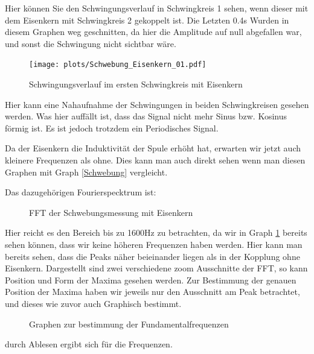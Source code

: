 \documentclass[twoside]{protokoll}
\begin{document}
Hier können Sie den Schwingungsverlauf in Schwingkreis 1 sehen, wenn dieser mit dem Eisenkern mit Schwingkreis 2 gekoppelt ist. 
Die Letzten 0.4s Wurden in diesem Graphen weg geschnitten, da hier die Amplitude auf null abgefallen war, und sonst die Schwingung nicht sichtbar wäre.
\begin{figure}[H]
    \centering
    \texttt{[image: plots/Schwebung\_Eisenkern\_01.pdf]}
    \caption{Schwingungsverlauf im ersten Schwingkreis mit Eisenkern }
    \label{Eisenkern beide Schwingungen}
\end{figure}

Hier kann eine Nahaufnahme der Schwingungen in beiden Schwingkreisen gesehen werden. Was hier auffällt ist, dass das Signal nicht mehr Sinus bzw. Kosinus förmig ist. Es ist jedoch trotzdem ein Periodisches Signal.

Da der Eisenkern die Induktivität der Spule erhöht hat, erwarten wir jetzt auch kleinere Frequenzen als ohne. Dies kann man auch direkt sehen wenn man diesen Graphen mit Graph \ref{Schwebung} vergleicht. 

Das dazugehörigen Fourierspecktrum ist:

\begin{figure}[H]
    \centering
    \hfill
    \caption{FFT der Schwebungsmessung mit Eisenkern }
\end{figure}

Hier reicht es den Bereich bis zu 1600Hz zu betrachten, da wir in Graph \ref{Eisenkern beide Schwingungen} bereits sehen können, dass wir keine höheren Frequenzen haben werden. Hier kann man bereits sehen, dass die Peaks näher beieinander liegen als in der Kopplung ohne Eisenkern.
Dargestellt sind zwei verschiedene zoom Ausschnitte der FFT, so kann Position und Form der Maxima gesehen werden.
 Zur Bestimmung der genauen Position der Maxima haben wir jeweils nur den Ausschnitt am Peak betrachtet, und dieses wie zuvor auch Graphisch bestimmt.

\begin{figure}[H]
    \centering
    \hfill
    \caption{Graphen zur bestimmung der Fundamentalfrequenzen}
\end{figure}

durch Ablesen ergibt sich für die Frequenzen.
\end{document}

